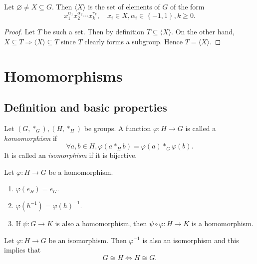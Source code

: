 \documentclass[10pt]{article}
\def\ge{\geqslant}
\begin{document}
    \begin{proposition}\label{prop:generation_of_groups}
        Let $ \varnothing \neq X \subseteq G $. Then $ \langle X \rangle $ is the set of elements of $ G $ of the form
        \[
            x_1^{\alpha_1}x_2^{\alpha_2}\cdots x_k^{r_k},\quad x_i\in X, \alpha_i\in \left\{ -1,1\right\}, k\ge 0
        .\]
    \end{proposition}
    \begin{proof}
        Let $T$ be such a set. Then by definition $ T \subseteq \langle X \rangle $. On the other hand, $ X \subseteq T \Rightarrow \langle X \rangle  \subseteq T$ since $T$ clearly forms a subgroup. Hence $ T=\langle X \rangle $.
    \end{proof}
    \section{Homomorphisms}
    \subsection{Definition and basic properties}
    \begin{definition}
        Let $ (G,*_G), (H,*_H) $ be groups. A function $ \varphi: H \to G $ is called a \textit{homomorphism} if
        \[
            \forall a,b\in H, \varphi (a*_Hb)=\varphi (a)*_G \varphi (b)
        .\]
        It is called an \textit{isomorphism} if it is bijective.
    \end{definition}
    \begin{proposition}\label{prop:homom}
        Let $ \varphi :H\to G $ be a homomorphism.
        \begin{enumerate}[(1)]
            \item $ \varphi (e_H)=e_G $.
            \item $ \varphi (h^{-1})=\varphi (h)^{-1} $.
            \item If $ \psi:G\to K $ is also a homomorphism, then $ \psi\circ \varphi :H\to K $ is a homomorphism.
        \end{enumerate}
    \end{proposition}
    \begin{proposition}\label{prop:isom_inverse_is_also_an_isom}
        Let $ \varphi :H\to G $ be an isomorphism. Then $ \varphi^{-1} $ is also an isomorphism and this implies that 
        \[
            G \cong H \Longleftrightarrow H \cong G
        .\]
    \end{proposition}
\end{document}

